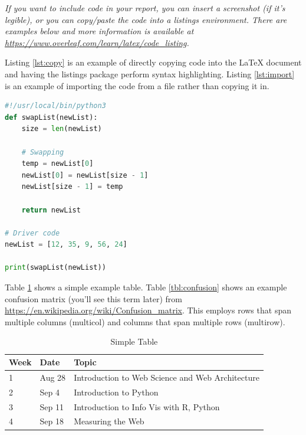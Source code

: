 \documentclass[12pt]{article}
\begin{document}
\emph{If you want to include code in your report, you can insert a screenshot (if it's legible), or you can copy/paste the code into a listings environment. There are examples below and more information is available at \url{https://www.overleaf.com/learn/latex/code_listing}.}

Listing \ref{lst:copy} is an example of directly copying code into the LaTeX document and having the listings package perform syntax highlighting. Listing \ref{lst:import} is an example of importing the code from a file rather than copying it in.

\begin{lstlisting}[language=Python, caption=Python example copied into the LaTeX, label=lst:copy]
#!/usr/local/bin/python3
def swapList(newList):
    size = len(newList)
     
    # Swapping
    temp = newList[0]
    newList[0] = newList[size - 1]
    newList[size - 1] = temp
     
    return newList
     
# Driver code
newList = [12, 35, 9, 56, 24]
 
print(swapList(newList))
\end{lstlisting}



Table \ref{tbl:simple} shows a simple example table.  Table \ref{tbl:confusion} shows an example confusion matrix (you'll see this term later) from \url{https://en.wikipedia.org/wiki/Confusion_matrix}. This employs rows that span multiple columns (multicol) and columns that span multiple rows (multirow). 

\begin{table}[h]
\centering
\caption{Simple Table}
\label{tbl:simple}
\begin{tabular}{|l|l|l|}
\hline
\textbf{Week} & \textbf{Date} & \textbf{Topic} \\ \hline \hline
1 & Aug 28	& Introduction to Web Science and Web Architecture \\ \hline
2 & Sep 4 & Introduction to Python\\ \hline
3 & Sep 11 & Introduction to Info Vis with R, Python \\ \hline
4 & Sep 18 & Measuring the Web \\ \hline
\end{tabular}
\end{table}
\end{document}
